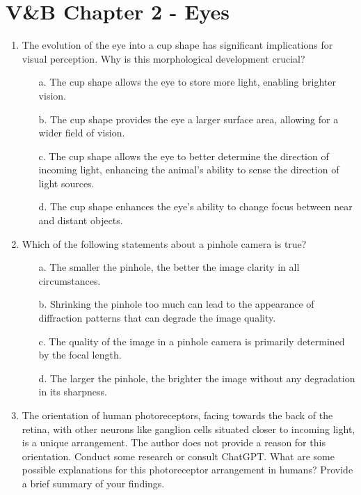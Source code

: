 \documentclass[11pt,letterpaper]{article}
\begin{document}
\section{V\&B Chapter 2 - Eyes}
\begin{enumerate}
    \item The evolution of the eye into a cup shape has significant implications for visual perception. Why is this morphological development crucial?
    \begin{enumerate}
        \item[a.] The cup shape allows the eye to store more light, enabling brighter vision.
        \item[b.] The cup shape provides the eye a larger surface area, allowing for a wider field of vision.
        \item[c.] The cup shape allows the eye to better determine the direction of incoming light, enhancing the animal's ability to sense the direction of light sources.
        \item[d.] The cup shape enhances the eye's ability to change focus between near and distant objects.
    \end{enumerate}

    \item Which of the following statements about a pinhole camera is true?
    \begin{enumerate}
        \item[a.] The smaller the pinhole, the better the image clarity in all circumstances.
        \item[b.] Shrinking the pinhole too much can lead to the appearance of diffraction patterns that can degrade the image quality.
        \item[c.] The quality of the image in a pinhole camera is primarily determined by the focal length.
        \item[d.] The larger the pinhole, the brighter the image without any degradation in its sharpness.
    \end{enumerate}

    \item The orientation of human photoreceptors, facing towards the back of the retina, with other neurons like ganglion cells situated closer to incoming light, is a unique arrangement. The author does not provide a reason for this orientation. Conduct some research or consult ChatGPT. What are some possible explanations for this photoreceptor arrangement in humans? Provide a brief summary of your findings.
    \vspace{3 cm}


\end{enumerate}
\end{document}
